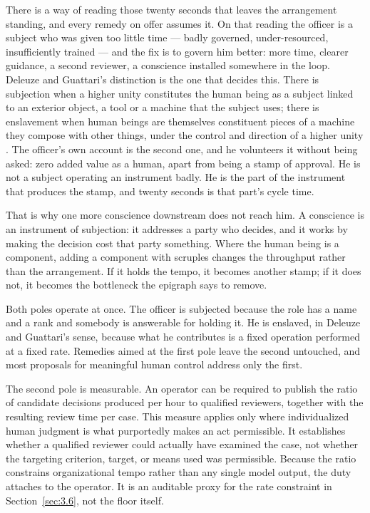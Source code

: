 There is a way of reading those twenty seconds that leaves the arrangement standing, and every remedy on offer assumes it. On that reading the officer is a subject who was given too little time — badly governed, under-resourced, insufficiently trained — and the fix is to govern him better: more time, clearer guidance, a second reviewer, a conscience installed somewhere in the loop. Deleuze and Guattari's distinction is the one that decides this. There is subjection when a higher unity constitutes the human being as a subject linked to an exterior object, a tool or a machine that the subject uses; there is enslavement when human beings are themselves constituent pieces of a machine they compose with other things, under the control and direction of a higher unity \autocite[Plateau~13]{deleuze1987plateaus}. The officer's own account is the second one, and he volunteers it without being asked: zero added value as a human, apart from being a stamp of approval. He is not a subject operating an instrument badly. He is the part of the instrument that produces the stamp, and twenty seconds is that part's cycle time.

That is why one more conscience downstream does not reach him. A
conscience is an instrument of subjection: it addresses a party who
decides, and it works by making the decision cost that party something.
Where the human being is a component, adding a component with scruples
changes the throughput rather than the arrangement. If it holds the
tempo, it becomes another stamp; if it does not, it becomes the
bottleneck the epigraph says to remove.

Both poles operate at once. The officer is subjected because the role
has a name and a rank and somebody is answerable for holding it. He is
enslaved, in Deleuze and Guattari's sense, because what he contributes
is a fixed operation performed at a fixed rate. Remedies aimed at the
first pole leave the second untouched, and most proposals for meaningful
human control address only the first.

The second pole is measurable. An operator can be required to publish
the ratio of candidate decisions produced per hour to qualified
reviewers, together with the resulting review time per case. This
measure applies only where individualized human judgment is what
purportedly makes an act permissible. It establishes whether a qualified
reviewer could actually have examined the case, not whether the
targeting criterion, target, or means used was permissible. Because the
ratio constrains organizational tempo rather than any single model
output, the duty attaches to the operator. It is an auditable proxy for
the rate constraint in Section~\ref{sec:3.6}, not the floor itself.

